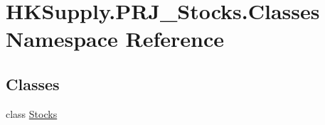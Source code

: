 \hypertarget{namespace_h_k_supply_1_1_p_r_j___stocks_1_1_classes}{}\section{H\+K\+Supply.\+P\+R\+J\+\_\+\+Stocks.\+Classes Namespace Reference}
\label{namespace_h_k_supply_1_1_p_r_j___stocks_1_1_classes}
\subsection*{Classes}
\begin{DoxyCompactItemize}
\item 
class \mbox{\hyperlink{class_h_k_supply_1_1_p_r_j___stocks_1_1_classes_1_1_stocks}{Stocks}}
\end{DoxyCompactItemize}
